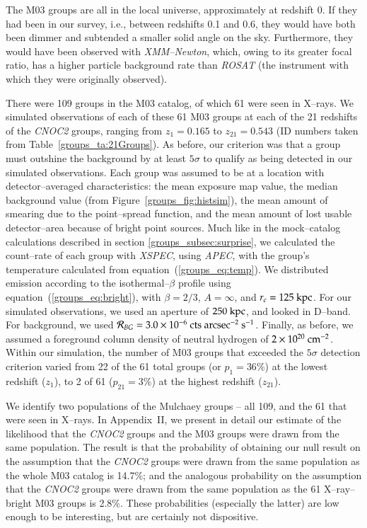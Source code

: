 The M03 groups are all in the local universe, approximately at
redshift 0.  If they had been in our survey, i.e., between redshifts
0.1 and 0.6, they would have both been dimmer and subtended a smaller
solid angle on the sky.  Furthermore, they would have been observed
with \textsl{XMM--Newton}, which, owing to its greater focal ratio,
has a higher particle background rate than \textsl{ROSAT} (the
instrument with which they were originally observed).

There were 109 groups in the M03 catalog, of which 61 were seen in
X--rays.  We simulated observations of each of these 61 M03 groups at
each of the 21 redshifts of the \textsl{CNOC2} groups, ranging from
$z_1 = 0.165$ to $z_{21} = 0.543$ (ID numbers taken from
Table~\ref{groups_ta:21Groups}).  As before, our criterion was that a
group must outshine the background by at least $5\sigma$ to qualify as
being detected in our simulated observations.  Each group was assumed
to be at a location with detector--averaged characteristics: the mean
exposure map value, the median background value (from
Figure~\ref{groups_fig:histsim}), the mean amount of smearing due to
the point--spread function, and the mean amount of lost usable
detector--area because of bright point sources.  Much like in the
mock--catalog calculations described in section
\ref{groups_subsec:surprise}, we calculated the count--rate of each
group with \textsl{XSPEC}, using \textsl{APEC}, with the group's
temperature calculated from equation~(\ref{groups_eq:temp}).  We
distributed emission according to the isothermal--$\beta$ profile
using equation~(\ref{groups_eq:bright}), with $\beta=2/3$, $A =
\infty$, and $r_c = 125 {\rm~kpc}$.  For our simulated observations,
we used an aperture of $250 {\rm~kpc}$, and looked in D--band.  For
background, we used $\mathcal{R}_{BG} = 3.0\times10^{-6}
{\rm~cts~arcsec^{-2}~s^{-1}}$.  Finally, as before, we assumed a
foreground column density of neutral hydrogen of $2\times10^{20}{\rm
~cm^{-2}}$.  Within our simulation, the number of M03 groups that
exceeded the $5\sigma$ detection criterion varied from 22 of the 61
total groups (or $p_1 = 36\%$) at the lowest redshift ($z_1$), to 2 of
61 ($p_{21} = 3\%$) at the highest redshift ($z_{21}$).

We identify two populations of the Mulchaey groups -- all 109, and the
61 that were seen in X--rays.  In Appendix~II, we present in detail
our estimate of the likelihood that the \textsl{CNOC2} groups and the
M03 groups were drawn from the same population.  The result is that
the probability of obtaining our null result on the assumption that
the \textsl{CNOC2} groups were drawn from the same population as the
whole M03 catalog is 14.7\%; and the analogous probability on the
assumption that the \textsl{CNOC2} groups were drawn from the same
population as the 61 X--ray--bright M03 groups is 2.8\%.  These
probabilities (especially the latter) are low enough to be
interesting, but are certainly not dispositive.


